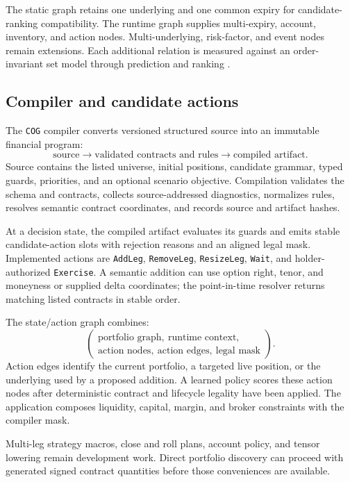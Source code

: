\documentclass{strategynet-journal}
\newcommand{\COG}{\texttt{COG}}
\begin{document}
The static graph retains one underlying and one common expiry for
candidate-ranking compatibility.  The runtime graph supplies multi-expiry,
account, inventory, and action nodes.  Multi-underlying, risk-factor, and
event nodes remain extensions.  Each additional relation is measured against
an order-invariant set model through prediction and ranking
\cite{deepsets,relational}.

\begin{SNcolumns}

\section{Compiler and candidate actions}
\label{sec:compiler}

The \COG{} compiler converts versioned structured source into an immutable
financial program:
\[
  \text{source}
  \longrightarrow
  \text{validated contracts and rules}
  \longrightarrow
  \text{compiled artifact}.
\]
Source contains the listed universe, initial positions, candidate grammar,
typed guards, priorities, and an optional scenario objective.  Compilation
validates the schema and contracts, collects source-addressed diagnostics,
normalizes rules, resolves semantic contract coordinates, and records source
and artifact hashes.

At a decision state, the compiled artifact evaluates its guards and emits
stable candidate-action slots with rejection reasons and an aligned legal
mask.  Implemented actions are \texttt{AddLeg}, \texttt{RemoveLeg},
\texttt{ResizeLeg}, \texttt{Wait}, and holder-authorized
\texttt{Exercise}.  A semantic addition can use option right, tenor, and
moneyness or supplied delta coordinates; the point-in-time resolver returns
matching listed contracts in stable order.

The state/action graph combines:
\[
  \left(
  \begin{gathered}
    \text{portfolio graph},\ \text{runtime context},\\
    \text{action nodes},\ \text{action edges},\ \text{legal mask}
  \end{gathered}
  \right).
\]
Action edges identify the current portfolio, a targeted live position, or the
underlying used by a proposed addition.  A learned policy scores these action
nodes after deterministic contract and lifecycle legality have been applied.
The application composes liquidity, capital, margin, and broker constraints
with the compiler mask.

Multi-leg strategy macros, close and roll plans, account policy, and tensor
lowering remain development work.  Direct portfolio discovery can proceed
with generated signed contract quantities before those conveniences are
available.


\end{SNcolumns}
\end{document}
